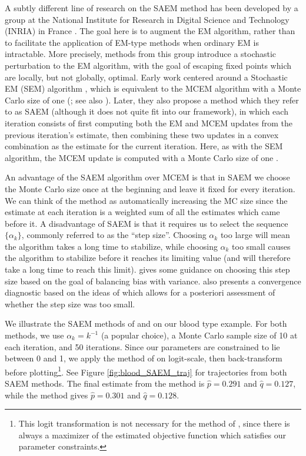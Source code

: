 \documentclass[11pt, oneside]{article}   	%
\begin{document}
A subtly different line of research on the SAEM method has been developed by a group at the National Institute for Research in Digital Science and Technology (INRIA) in France \citep[see, e.g.,][for a discussion of some of their methods]{Cel95}. The goal here is to augment the EM algorithm, rather than to facilitate the application of EM-type methods when ordinary EM is intractable. More precisely, methods from this group introduce a stochastic perturbation to the EM algorithm, with the goal of escaping fixed points which are locally, but not globally, optimal. Early work centered around a Stochastic EM (SEM) algorithm \citep{Cel85}, which is equivalent to the MCEM algorithm with a Monte Carlo size of one (\citealp{Cel87,Cel95}; see also \citealp{Nie00II}). Later, they also propose a method which they refer to as SAEM (although it does not quite fit into our framework), in which each iteration consists of first computing both the EM and MCEM updates from the previous iteration's estimate, then combining these two updates in a convex combination as the estimate for the current iteration. Here, as with the SEM algorithm, the MCEM update is computed with a Monte Carlo size of one \citep{Cel92, Cel95}.

An advantage of the SAEM algorithm over MCEM is that in SAEM we choose the Monte Carlo size once at the beginning and leave it fixed for every iteration. We can think of the method as automatically increasing the MC size since the estimate at each iteration is a weighted sum of all the estimates which came before it. A disadvantage of SAEM is that it requires us to select the sequence $\{ \alpha_k \}$, commonly referred to as the ``step size''. Choosing $\alpha_k$ too large will mean the algorithm takes a long time to stabilize, while choosing $\alpha_k$ too small causes the algorithm to stabilize before it reaches its limiting value (and will therefore take a long time to reach this limit). \citet{Jan06} gives some guidance on choosing this step size based on the goal of balancing bias with variance. \citeauthor{Jan06} also presents a convergence diagnostic based on the ideas of \citet{Caf05} which allows for a posteriori assessment of whether the step size was too small. 

We illustrate the SAEM methods of \citet{Gu98I} and \citet{Dey99} on our blood type example. For both methods, we use $\alpha_k = k^{-1}$ (a popular choice), a Monte Carlo sample size of 10 at each iteration, and 50 iterations. Since our parameters are constrained to lie between 0 and 1, we apply the method of \citeauthor{Gu98I} on logit-scale, then back-transform before plotting\footnote{This logit transformation is not necessary for the method of \citet{Dey99}, since there is always a maximizer of the estimated objective function which satisfies our parameter constraints.}. See Figure \ref{fig:blood_SAEM_traj} for trajectories from both SAEM methods. The final estimate from the \citeauthor{Gu98I} method is $\hat{p} = 0.291$ and $\hat{q} = 0.127$, while the \citeauthor{Dey99} method gives $\hat{p} = 0.301$ and $\hat{q} = 0.128$. 
\end{document}
